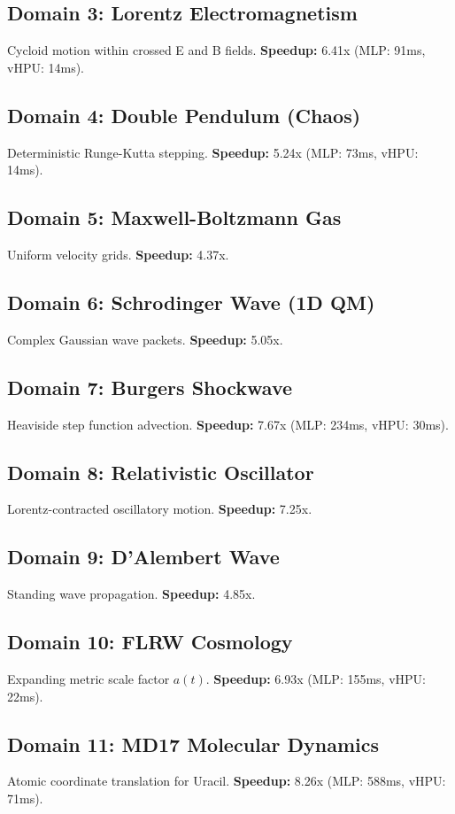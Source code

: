 \documentclass[11pt,a4paper]{article}
\begin{document}
\subsection{Domain 3: Lorentz Electromagnetism}
Cycloid motion within crossed E and B fields. 
\textbf{Speedup:} 6.41x (MLP: 91ms, vHPU: 14ms).

\subsection{Domain 4: Double Pendulum (Chaos)}
Deterministic Runge-Kutta stepping. 
\textbf{Speedup:} 5.24x (MLP: 73ms, vHPU: 14ms).

\subsection{Domain 5: Maxwell-Boltzmann Gas}
Uniform velocity grids. 
\textbf{Speedup:} 4.37x.

\subsection{Domain 6: Schrodinger Wave (1D QM)}
Complex Gaussian wave packets. 
\textbf{Speedup:} 5.05x.

\subsection{Domain 7: Burgers Shockwave}
Heaviside step function advection. 
\textbf{Speedup:} 7.67x (MLP: 234ms, vHPU: 30ms).

\subsection{Domain 8: Relativistic Oscillator}
Lorentz-contracted oscillatory motion. 
\textbf{Speedup:} 7.25x.

\subsection{Domain 9: D'Alembert Wave}
Standing wave propagation. 
\textbf{Speedup:} 4.85x.

\subsection{Domain 10: FLRW Cosmology}
Expanding metric scale factor $a(t)$. 
\textbf{Speedup:} 6.93x (MLP: 155ms, vHPU: 22ms).

\subsection{Domain 11: MD17 Molecular Dynamics}
Atomic coordinate translation for Uracil. 
\textbf{Speedup:} 8.26x (MLP: 588ms, vHPU: 71ms).
\end{document}

